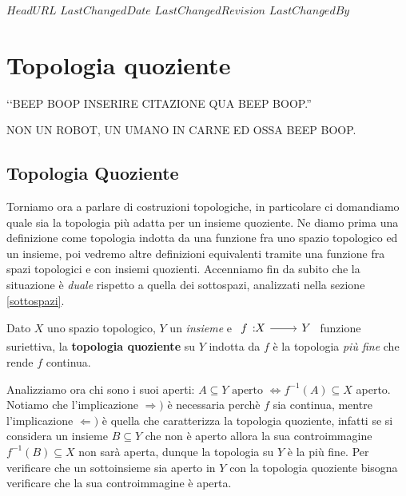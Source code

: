 \svnidlong
{$HeadURL$}
{$LastChangedDate$}
{$LastChangedRevision$}
{$LastChangedBy$}

\chapter{Topologia quoziente}

\begin{introduction}
‘‘BEEP BOOP INSERIRE CITAZIONE QUA BEEP BOOP.''
\begin{flushright}
	\textsc{NON UN ROBOT,} UN UMANO IN CARNE ED OSSA BEEP BOOP.
\end{flushright}
\end{introduction}

		\section{Topologia Quoziente}
Torniamo ora a parlare di costruzioni topologiche, in particolare ci domandiamo quale sia la topologia più adatta per un insieme quoziente. Ne diamo prima una definizione come topologia indotta da una funzione fra uno spazio topologico ed un insieme, poi vedremo altre definizioni equivalenti tramite una funzione fra spazi topologici e con insiemi quozienti.\newline
Accenniamo fin da subito che la situazione è \textit{duale} rispetto a quella dei sottospazi, analizzati nella sezione \ref{sottospazi}.
\begin{define}
	Dato $X$ uno spazio topologico, $Y$ un \textit{insieme} e $\funz f X Y$ funzione suriettiva, la \textbf{topologia quoziente} su $Y$ indotta da $f$ è la topologia \textit{più fine} che rende $f$ continua.
\end{define}
Analizziamo ora chi sono i suoi aperti: $\displaystyle A\subseteq Y \text{ aperto } \iff f^{-1}(A)\subseteq X$ aperto. Notiamo che l'implicazione $\Rightarrow)$ è necessaria perchè $f$ sia continua, mentre l'implicazione $\Leftarrow)$ è quella che caratterizza la topologia quoziente, infatti se si considera un insieme $B\subseteq Y$ che non è aperto allora la sua controimmagine $f^{-1}(B)\subseteq X$ non sarà aperta, dunque la topologia su $Y$ è la più fine.\newline
Per verificare che un sottoinsieme sia aperto in $Y$ con la topologia quoziente bisogna verificare che la sua controimmagine è aperta.

